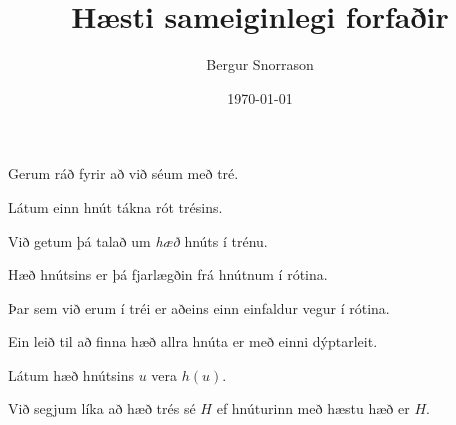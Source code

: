 \title{Hæsti sameiginlegi forfaðir}
\author{Bergur Snorrason}
\date{\today}



\frame{\titlepage}

{
	{
		\item<1-> Gerum ráð fyrir að við séum með tré.
		\item<2-> Látum einn hnút tákna rót trésins.
		\item<3-> Við getum þá talað um \emph{hæð} hnúts í trénu.
		\item<4-> Hæð hnútsins er þá fjarlægðin frá hnútnum í rótina.
		\item<5-> Þar sem við erum í tréi er aðeins einn einfaldur vegur í rótina.
		\item<6-> Ein leið til að finna hæð allra hnúta er með einni dýptarleit.
		\item<7-> Látum hæð hnútsins $u$ vera $h(u)$.
		\item<8-> Við segjum líka að hæð trés sé $H$ ef hnúturinn með hæstu hæð er $H$.
	}
}


